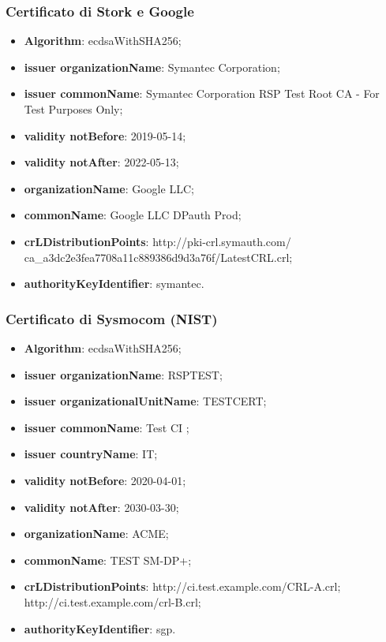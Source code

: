 \documentclass[10pt, oneside]{book}
\begin{document}
\subsubsection{Certificato di Stork e Google}
\begin{itemize}
\item \textbf{Algorithm}: ecdsaWithSHA256;
\item \textbf{issuer organizationName}: Symantec Corporation;
\item \textbf{issuer commonName}: Symantec Corporation RSP Test Root CA - For Test Purposes Only;
\item \textbf{validity notBefore}: 2019-05-14;
\item \textbf{validity notAfter}: 2022-05-13;
\item \textbf{organizationName}: Google LLC;
\item \textbf{commonName}: Google LLC DPauth Prod;
\item \textbf{crLDistributionPoints}: http://pki-crl.symauth.com/\\ca\_a3dc2e3fea7708a11c889386d9d3a76f/LatestCRL.crl;
\item \textbf{authorityKeyIdentifier}: symantec.
\end{itemize}

\subsubsection{Certificato di Sysmocom (NIST)}
\begin{itemize}
\item \textbf{Algorithm}: ecdsaWithSHA256;
\item \textbf{issuer organizationName}: RSPTEST;
\item \textbf{issuer organizationalUnitName}: TESTCERT;
\item \textbf{issuer commonName}: Test CI ;
\item \textbf{issuer countryName}: IT;
\item \textbf{validity notBefore}: 2020-04-01;
\item \textbf{validity notAfter}: 2030-03-30;
\item \textbf{organizationName}: ACME;
\item \textbf{commonName}: TEST SM-DP+;
\item \textbf{crLDistributionPoints}: http://ci.test.example.com/CRL-A.crl;\\http://ci.test.example.com/crl-B.crl;
\item \textbf{authorityKeyIdentifier}: sgp.
\end{itemize}
\end{document}
